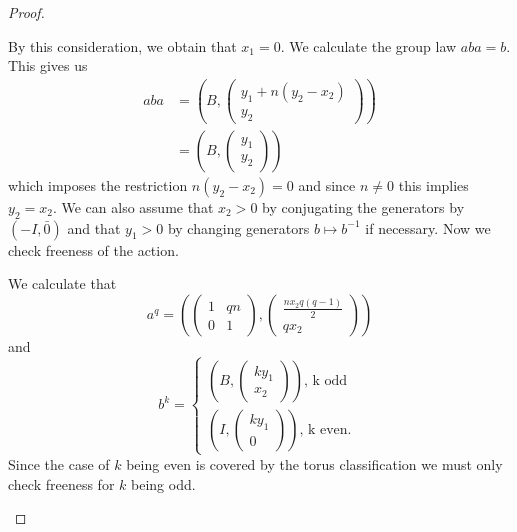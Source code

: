 \begin{proof}
\begin{case}[$A=A_1$, $B=B_1$]
        By this consideration, we obtain that $x_1 = 0$. We calculate the group law $aba = b$.
        This gives us
        \begin{align*}
            aba & = \left(B, \begin{pmatrix}
                                 y_1 + n(y_2-x_2) \\
                                 y_2
                             \end{pmatrix}\right)   \\
                & = \left( B, \begin{pmatrix}
                                  y_1 \\ y_2
                              \end{pmatrix} \right)
        \end{align*}
        which imposes the restriction $n(y_2 - x_2) = 0$ and since $n \neq 0$ this implies $y_2 = x_2$. We can also assume that $x_2>0$ by conjugating the generators by $(-I, \bar{0})$ and that $y_1>0$ by changing generators $b \mapsto b^{-1}$ if necessary.
        Now we check freeness of the action.

        We calculate that $$ a^q = \left( \begin{pmatrix}
                    1 & qn \\ 0 & 1
                \end{pmatrix}, \begin{pmatrix}
                    \frac{nx_2 q(q-1)}{2} \\ qx_2
                \end{pmatrix} \right)
        $$
        and
        $$b^k = \begin{cases*}
                \left( B, \begin{pmatrix}
                                  ky_1 \\ x_2
                              \end{pmatrix} \right) \text{, k odd } \\
                \left( I, \begin{pmatrix}
                                  ky_1 \\ 0
                              \end{pmatrix} \right)\text{, k even. }
            \end{cases*}$$
        Since the case of $k$ being even is covered by the torus classification we must only check freeness for $k$ being odd.


\end{case}
\end{proof}
